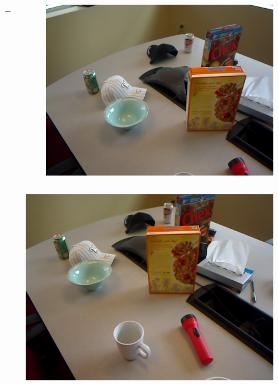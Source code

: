 \documentclass[]{beamer}
\begin{document}
\begin{frame}{}
\begin{columns}
        \begin{column}{0.5cm}
            \centering
            $\rightarrow$
        \end{column}

        \begin{column}{3cm}
            \begin{figure}[t]
                \centering
                \includegraphics[width=\textwidth]{img/rafaga/3.png}
            \end{figure}
        \end{column}

    \end{columns}

    \begin{columns}
        \begin{column}{3cm}
            \begin{figure}[t]
                \centering
                \includegraphics[width=\textwidth]{img/rafaga/4.png}
            \end{figure}
        \end{column}


\end{columns}
\end{frame}
\end{document}
